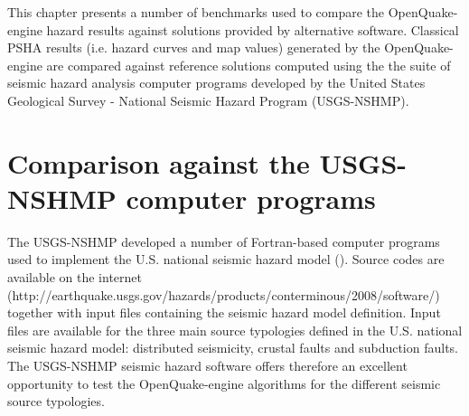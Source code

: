 This chapter presents a number of benchmarks used to compare the OpenQuake-engine
hazard results against solutions provided by alternative software. Classical PSHA results (i.e. hazard curves and map values) generated by the OpenQuake-engine are compared against reference solutions computed using the the suite of seismic hazard analysis computer programs developed by the United States Geological Survey - National Seismic Hazard Program (USGS-NSHMP).
%
%
%
\section{Comparison against the USGS-NSHMP computer programs}
The USGS-NSHMP developed a number of Fortran-based computer programs used to implement the U.S. national seismic hazard model (\cite{petersen2008}). Source codes are available on the internet (http://earthquake.usgs.gov/hazards/products/conterminous/2008/software/) together with input files containing the seismic hazard model definition. Input files are available for the three main source typologies
defined in the U.S. national seismic hazard model: distributed seismicity, crustal faults and subduction faults.
The USGS-NSHMP seismic hazard software offers therefore an excellent opportunity to test the OpenQuake-engine algorithms for the different seismic source typologies.

